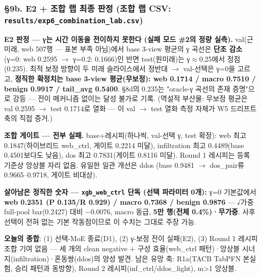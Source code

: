 \subsubsection{§9b. E2 +\allowbreak{} 조합 랩 최종 판정 (조합 랩 CSV: \texttt{results/\allowbreak{}\allowbreak{}exp6\_\allowbreak{}\allowbreak{}com\allowbreak{}bination\allowbreak{}\_\allowbreak{}\allowbreak{}lab.\allowbreak{}csv\allowbreak{}})}
\textbf{E2 판정 — γ는 시간 이동을 전이하지 못한다 (실패 모드 \#2의 정량 실측).} val(근미래, web 507행 — 표본 부족 아님)에서 base 3-view 평균의 γ 곡선은 \textbf{단조 감소}(γ=\allowbreak{}0: web 0.2595  \ensuremath{\rightarrow}  γ=\allowbreak{}0.2: 0.1666)인 반면 test(원미래)는 γ\ensuremath{\approx}0.25에서 정점(0.235). 최적 보정 방향이 두 미래 슬라이스에서 정반대  \ensuremath{\rightarrow}  val-선택은 γ=\allowbreak{}0을 고르고, \textbf{정직한 확정치는 base 3-view 평균(무보정): web 0.1714 /\allowbreak{} macro 0.7510 /\allowbreak{} benign 0.9917 /\allowbreak{} tail\_\allowbreak{}avg 0.5400}. §8d의 0.235는 "oracle-γ 곡선의 존재 증명"으로 강등 — 전이 메커니즘 없이는 달성 불가로 기록. (역설적 부산물: 무보정 평균은 val 0.2595  \ensuremath{\rightarrow}  test 0.1714로 열화 — 이 val \ensuremath{\rightarrow} test 열화 측정 자체가 W5 드리프트 축의 직접 증거.)

\textbf{조합 게이트 — 전부 실패.} base+\allowbreak{}레시피(하나씩, val-선택 γ, test 확정): web 최고 0.1847(하이브리드 web\_\allowbreak{}ctrl, 게이트 0.2214 미달), infiltration 최고 0.4489(base 0.4501보다도 낮음), dos 최고 0.7831(게이트 0.8116 미달). Round 1 레시피는 등록 기준상 앙상블 자리 없음. 유일한 일관 개선은 ddos (base 0.9481  \ensuremath{\rightarrow}  dos\_\allowbreak{}pair류 0.9665–0.9718, 게이트 비대상).

\textbf{살아남은 정직한 숫자 — \texttt{xgb\_\allowbreak{}\allowbreak{}web\_\allowbreak{}\allowbreak{}ctrl} 단독 (선택 파라미터 0개):} γ=\allowbreak{}0 기본값에서 \textbf{web 0.2351 (P 0.135/\allowbreak{}R 0.929) /\allowbreak{} macro 0.7368 /\allowbreak{} benign 0.9876} — √가중 full-pool bar(0.2427) 대비 −0.0076, macro 동급, \textbf{5만 행(전체 0.4\%)·무가중}. 사후 선택이 전혀 없는 기본 작동점이므로 이 수치는 그대로 주장 가능.

\textbf{오늘의 종합}: (1) 선택-MoE 종료(D1), (2) γ-보정 전이 실패(E2), (3) Round 1 레시피 조합 기여 없음 — 세 개의 clean negative +\allowbreak{} 구성 효율(web\_\allowbreak{}ctrl 패턴)·앙상블 시너지(infiltration)·혼동쌍(ddos)의 양성 발견. 남은 유망 축: R1a(TACB TabPFN 본실험, 승리 패턴과 동방향), Round 2 레시피(inf\_\allowbreak{}ctrl/\allowbreak{}ddos\_\allowbreak{}light), m>1 앙상블.

